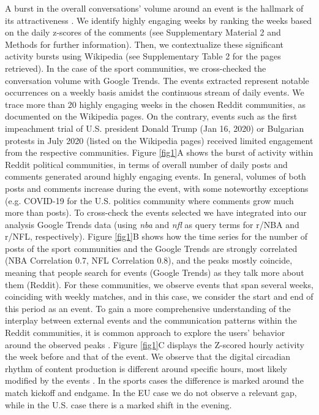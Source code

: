 \documentclass[fleqn,10pt]{wlscirep}
\begin{document}
A burst in the overall conversations' volume around an event is the hallmark of its attractiveness \cite{wu2007novelty,sasahara2013quantifying}.
We identify highly engaging weeks by ranking the weeks based on the daily z-scores of the comments (see Supplementary Material 2 and Methods for further information).
Then, we contextualize these significant activity bursts using Wikipedia (see Supplementary Table 2 for the pages retrieved). In the case of the sport communities, we cross-checked the conversation volume with Google Trends.
The events extracted represent notable occurrences on a weekly basis amidst the continuous stream of daily events.
We trace more than 20 highly engaging weeks in the chosen Reddit communities, as documented on the Wikipedia pages.
On the contrary, events such as the first impeachment trial of U.S. president Donald Trump (Jan 16, 2020) or Bulgarian protests in July 2020 (listed on the Wikipedia pages) received limited engagement from the respective communities.
Figure \ref{fig1}A shows the burst of activity within Reddit political communities, in terms of overall number of daily posts and comments generated around highly engaging events.
In general, volumes of both posts and comments increase during the event, with some noteworthy exceptions (e.g. COVID-19 for the U.S. politics community where comments grow much more than posts). 
To cross-check the events selected we have integrated into our analysis Google Trends data (using \emph{nba} and \emph{nfl} as query terms for r/NBA and r/NFL, respectively).
Figure \ref{fig1}B shows how the time series for the number of posts of the sport communities and the Google Trends are strongly correlated (NBA Correlation 0.7, NFL Correlation 0.8), and the peaks mostly coincide, meaning that people search for events (Google Trends) as they talk more about them (Reddit).
For these communities, we observe events that span several weeks, coinciding with weekly matches, and in this case, we consider the start and end of this period as an event.
To gain a more comprehensive understanding of the interplay between external events and the communication patterns within the Reddit communities, it is common approach to explore the users' behavior around the observed peaks \cite{he2017measuring,sasahara2013quantifying}.
Figure \ref{fig1}C displays the Z-scored hourly activity the week before and that of the event. 
We observe that the digital circadian rhythm of content production is different around specific hours, most likely modified by the events \cite{sasahara2013quantifying}. 
In the sports cases the difference is marked around the match kickoff and endgame.
In the EU case we do not observe a relevant gap, while in the U.S. case there is a marked shift in the evening. 
\end{document}
